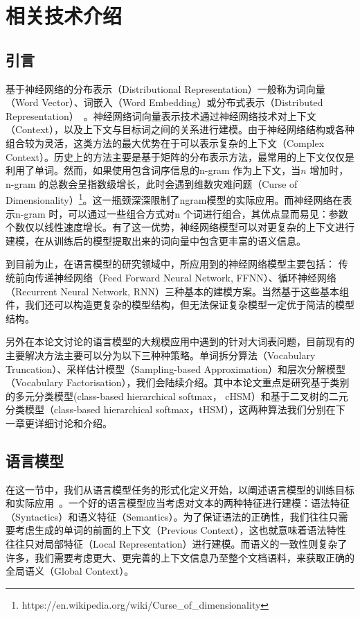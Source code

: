 \chapter{相关技术介绍}
\section{引言}
基于神经网络的分布表示（Distributional Representation）一般称为词向量（Word Vector）、词嵌入（Word Embedding）或分布式表示（Distributed Representation）~。神经网络词向量表示技术通过神经网络技术对上下文（Context），以及上下文与目标词之间的关系进行建模。由于神经网络结构或各种组合较为灵活，这类方法的最大优势在于可以表示复杂的上下文（Complex Context）。历史上的方法主要是基于矩阵的分布表示方法，最常用的上下文仅仅是利用了单词。然而，如果使用包含词序信息的n-gram 作为上下文，当$n$ 增加时，n-gram 的总数会呈指数级增长，此时会遇到维数灾难问题（Curse of Dimensionality）\footnote{https://en.wikipedia.org/wiki/Curse\_of\_dimensionality}。这一瓶颈深深限制了ngram模型的实际应用。而神经网络在表示n-gram 时，可以通过一些组合方式对n 个词进行组合，其优点显而易见：参数个数仅以线性速度增长。有了这一优势，神经网络模型可以对更复杂的上下文进行建模，在从训练后的模型提取出来的词向量中包含更丰富的语义信息。

到目前为止，在语言模型的研究领域中，所应用到的神经网络模型主要包括： 传统前向传递神经网络（Feed Forward Neural Network, FFNN）、循环神经网络（Recurrent Neural Network, RNN）三种基本的建模方案。当然基于这些基本组件，我们还可以构造更复杂的模型结构，但无法保证复杂模型一定优于简洁的模型结构。

另外在本论文讨论的语言模型的大规模应用中遇到的针对大词表问题，目前现有的主要解决方法主要可以分为以下三种种策略。单词拆分算法（Vocabulary Truncation）、采样估计模型（Sampling-based Approximation）和层次分解模型（Vocabulary Factorisation），我们会陆续介绍。其中本论文重点是研究基于类别的多元分类模型(class-based hierarchical softmax， cHSM）和基于二叉树的二元分类模型（class-based hierarchical softmax，tHSM），这两种算法我们分别在下一章更详细讨论和介绍。

\section{语言模型}
在这一节中，我们从语言模型任务的形式化定义开始，以阐述语言模型的训练目标和实际应用~。一个好的语言模型应当考虑对文本的两种特征进行建模：语法特征（Syntactics）和语义特征（Semantics）。为了保证语法的正确性，我们往往只需要考虑生成的单词的前面的上下文（Previous Context），这也就意味着语法特性往往只对局部特征（Local Representation）进行建模。而语义的一致性则复杂了许多，我们需要考虑更大、更完善的上下文信息乃至整个文档语料，来获取正确的全局语义（Global Context）。


